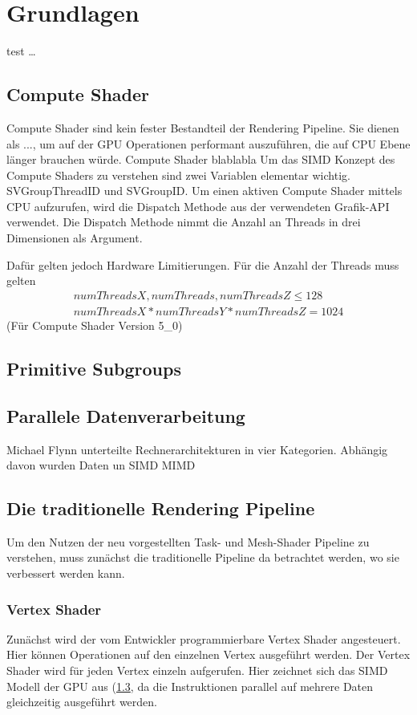 \section{Grundlagen}

test \ldots

\subsection{Compute Shader}
\label{subsec:compute_shader}
Compute Shader sind kein fester Bestandteil der Rendering Pipeline.
Sie dienen als ..., um auf der GPU Operationen performant auszuführen, die auf CPU Ebene länger brauchen würde.
Compute Shader blablabla
Um das SIMD Konzept des Compute Shaders zu verstehen sind zwei Variablen elementar wichtig.
SVGroupThreadID und SVGroupID.
Um einen aktiven Compute Shader mittels CPU aufzurufen, wird die Dispatch Methode aus der verwendeten Grafik-API verwendet.
Die Dispatch Methode nimmt die Anzahl an Threads in drei Dimensionen als Argument.


Dafür gelten jedoch Hardware Limitierungen.
Für die Anzahl der Threads muss gelten
\begin{gather*}
	numThreadsX, numThreads, numThreadsZ \leq 128 \\
	numThreadsX * numThreadsY * numThreadsZ = 1024
\end{gather*}
(Für Compute Shader Version 5\_0)

\subsection{Primitive Subgroups}
\label{subsec:primitive_subgroups}

\subsection{Parallele Datenverarbeitung}
\label{subsec:flynn}
Michael Flynn unterteilte Rechnerarchitekturen in vier Kategorien. Abhängig davon wurden Daten un \cite{Jakob2017}
SIMD
MIMD

\subsection{Die traditionelle Rendering Pipeline}
\label{subsec:traditionelle_renderingpipeline}
Um den Nutzen der neu vorgestellten Task- und Mesh-Shader Pipeline zu verstehen, muss zunächst die traditionelle Pipeline da betrachtet werden, wo sie verbessert werden kann.
\subsubsection{Vertex Shader}
Zunächst wird der vom Entwickler programmierbare Vertex Shader angesteuert.
Hier können Operationen auf den einzelnen Vertex ausgeführt werden.
Der Vertex Shader wird für jeden Vertex einzeln aufgerufen.
Hier zeichnet sich das SIMD Modell der GPU aus (\ref{subsec:flynn}, da die Instruktionen parallel auf mehrere Daten gleichzeitig ausgeführt werden.
